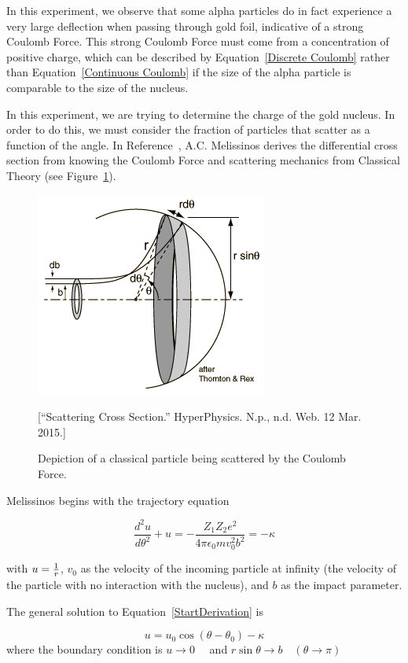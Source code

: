 In this experiment, we observe that some alpha particles do in fact experience a very large deflection when passing through gold foil, indicative of a strong Coulomb Force. This strong Coulomb Force must come from a concentration of positive charge, which can be described by Equation~\ref{Discrete Coulomb} rather than Equation~\ref{Continuous Coulomb} if the size of the alpha particle is comparable to the size of the nucleus. 

In this experiment, we are trying to determine the charge of the gold nucleus. In order to do this, we must consider the fraction of particles that scatter as a function of the angle. In Reference~\cite{Melissinos}, A.C. Melissinos derives the differential cross section from knowing the Coulomb Force and scattering mechanics from Classical Theory (see Figure~\ref{ScatteringTheory}). 

\begin{figure}[h]
  \includegraphics[width = 4 cm]{ruthcross.png}
  \begin{center}
  \caption{Depiction of a classical particle being scattered by the Coulomb Force.}[\footnotesize{``Scattering Cross Section.'' HyperPhysics. N.p., n.d. Web. 12 Mar. 2015.}]
  \label{ScatteringTheory}
  \end{center}
\end{figure}

Melissinos begins with the trajectory equation

\begin{equation}
  \frac{d^{2}u}{d\theta^{2}}+u=-\frac{Z_{1}Z_{2}e^{2}}{4\pi\epsilon_{0}mv_{0}^{2}b^{2} } = - \kappa
  \label{StartDerivation}
\end{equation}

with $u={1 \over r}$, $v_0$ as the velocity of the incoming particle at infinity (the velocity of the particle with no interaction with the nucleus), and $b$ as the impact parameter. 

The general solution to Equation~\ref{StartDerivation} is 

\begin{equation}
u=u_{0}\cos(\theta-\theta_{0})-\kappa
\label{adsf}
\end{equation} 
where the boundary condition is $u\to 0 \quad$ and $r\sin\theta\to b \quad(\theta\to\pi)$ 

